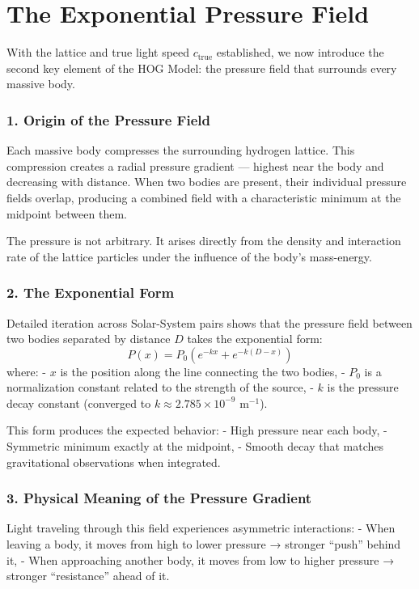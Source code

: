 \documentclass[11pt,a4paper]{book}
\begin{document}
\chapter{The Exponential Pressure Field}

With the lattice and true light speed \( c_{\text{true}} \) established, we now introduce the second key element of the HOG Model: the pressure field that surrounds every massive body.

\subsection{1. Origin of the Pressure Field}
Each massive body compresses the surrounding hydrogen lattice. This compression creates a radial pressure gradient — highest near the body and decreasing with distance. When two bodies are present, their individual pressure fields overlap, producing a combined field with a characteristic minimum at the midpoint between them.

The pressure is not arbitrary. It arises directly from the density and interaction rate of the lattice particles under the influence of the body’s mass-energy.

\subsection{2. The Exponential Form}
Detailed iteration across Solar-System pairs shows that the pressure field between two bodies separated by distance \( D \) takes the exponential form:
\[
P(x) = P_0 \left( e^{-k x} + e^{-k (D - x)} \right)
\]
where:
- \( x \) is the position along the line connecting the two bodies,
- \( P_0 \) is a normalization constant related to the strength of the source,
- \( k \) is the pressure decay constant (converged to \( k \approx 2.785 \times 10^{-9} \) m\(^{-1}\)).

This form produces the expected behavior:
- High pressure near each body,
- Symmetric minimum exactly at the midpoint,
- Smooth decay that matches gravitational observations when integrated.

\subsection{3. Physical Meaning of the Pressure Gradient}
Light traveling through this field experiences asymmetric interactions:
- When leaving a body, it moves from high to lower pressure → stronger “push” behind it,
- When approaching another body, it moves from low to higher pressure → stronger “resistance” ahead of it.
\end{document}
